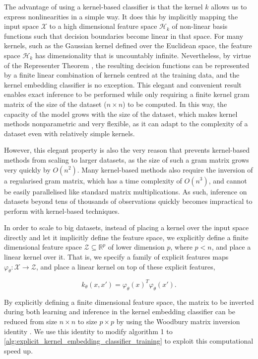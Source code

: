\documentclass{article}
\numberwithin{equation}{section}
\numberwithin{table}{section}
\numberwithin{algorithm}{section}
\begin{document}
		The advantage of using a kernel-based classifier is that the kernel $k$ allows us to express nonlinearities in a simple way. It does this by implicitly mapping the input space $\mathcal{X}$ to a high dimensional feature space $\mathcal{H}_{k}$ of non-linear basis functions such that decision boundaries become linear in that space. For many kernels, such as the Gaussian kernel defined over the Euclidean space, the feature space $\mathcal{H}_{k}$ has dimensionality that is uncountably infinite. Nevertheless, by virtue of the Representer Theorem \citep{kimeldorf1971some}, the resulting decision functions can be represented by a finite linear combination of kernels centred at the training data, and the kernel embedding classifier is no exception. This elegant and convenient result enables exact inference to be performed while only requiring a finite kernel gram matrix of the size of the dataset ($n \times n$) to be computed. In this way, the capacity of the model grows with the size of the dataset, which makes kernel methods nonparametric and very flexible, as it can adapt to the complexity of a dataset even with relatively simple kernels. 
		
		However, this elegant property is also the very reason that prevents kernel-based methods from scaling to larger datasets, as the size of such a gram matrix grows very quickly by $O(n^{2})$. Many kernel-based methods also require the inversion of a regularised gram matrix, which has a time complexity of $O(n^{3})$, and cannot be easily parallelised like standard matrix multiplications. As such, inference on datasets beyond tens of thousands of observations quickly becomes impractical to perform with kernel-based techniques.
		
		In order to scale to big datasets, instead of placing a kernel over the input space directly and let it implicitly define the feature space, we explicitly define a finite dimensional feature space $\mathcal{Z} \subseteq \mathbb{R}^{p}$ of lower dimension $p$, where $p < n$, and place a linear kernel over it. That is, we specify a family of explicit features maps $\varphi_{\theta} : \mathcal{X} \to \mathcal{Z}$, and place a linear kernel on top of these explicit features,
		
		\begin{equation}
			k_{\theta}(x, x') = \varphi_{\theta}(x)^{T} \varphi_{\theta}(x').
		\end{equation}
		
		By explicitly defining a finite dimensional feature space, the matrix to be inverted during both learning and inference in the kernel embedding classifier can be reduced from size $n \times n$ to size $p \times p$ by using the Woodbury matrix inversion identity \citep{higham2002accuracy}. We use this identity to modify algorithm 1 to \cref{alg:explicit_kernel_embedding_classifier_training} to exploit this computational speed up.
		
\end{document}
